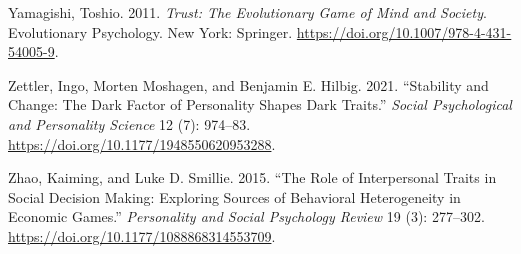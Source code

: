 \documentclass[
]{article}
\newlength{\cslhangindent}
\newenvironment{CSLReferences}[2] %
 {\begin{list}{}{%
  \setlength{\itemindent}{0pt}
  \setlength{\leftmargin}{0pt}
  \setlength{\parsep}{0pt}
  \ifodd #1
   \setlength{\leftmargin}{\cslhangindent}
   \setlength{\itemindent}{-1\cslhangindent}
  \fi
  \setlength{\itemsep}{#2\baselineskip}}}
 {\end{list}}
\begin{document}
\begin{CSLReferences}{1}{0}
Yamagishi, Toshio. 2011. \emph{Trust: The Evolutionary Game of Mind and Society}. Evolutionary Psychology. New York: Springer. \url{https://doi.org/10.1007/978-4-431-54005-9}.

Zettler, Ingo, Morten Moshagen, and Benjamin E. Hilbig. 2021. {``Stability and Change: {The} {Dark Factor of Personality} Shapes Dark Traits.''} \emph{Social Psychological and Personality Science} 12 (7): 974--83. \url{https://doi.org/10.1177/1948550620953288}.

Zhao, Kaiming, and Luke D. Smillie. 2015. {``The Role of Interpersonal Traits in Social Decision Making: {Exploring} Sources of Behavioral Heterogeneity in Economic Games.''} \emph{Personality and Social Psychology Review} 19 (3): 277--302. \url{https://doi.org/10.1177/1088868314553709}.

\end{CSLReferences}
\end{document}

